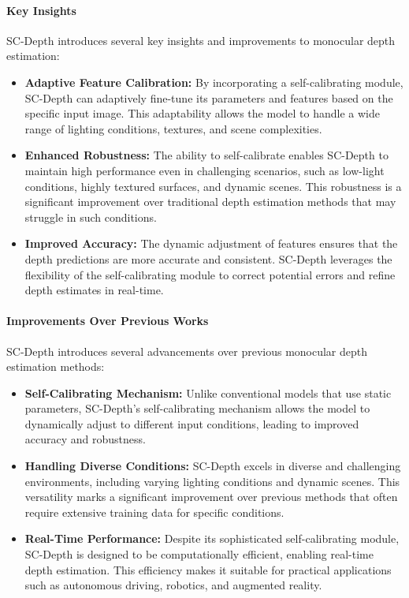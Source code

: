 \documentclass[12pt]{article}
\begin{document}
\paragraph{Key Insights}

SC-Depth introduces several key insights and improvements to monocular depth estimation:

\begin{itemize}
    \item \textbf{Adaptive Feature Calibration:} By incorporating a self-calibrating module, SC-Depth can adaptively fine-tune its parameters and features based on the specific input image. This adaptability allows the model to handle a wide range of lighting conditions, textures, and scene complexities.
    
    \item \textbf{Enhanced Robustness:} The ability to self-calibrate enables SC-Depth to maintain high performance even in challenging scenarios, such as low-light conditions, highly textured surfaces, and dynamic scenes. This robustness is a significant improvement over traditional depth estimation methods that may struggle in such conditions.
    
    \item \textbf{Improved Accuracy:} The dynamic adjustment of features ensures that the depth predictions are more accurate and consistent. SC-Depth leverages the flexibility of the self-calibrating module to correct potential errors and refine depth estimates in real-time.
\end{itemize}

\paragraph{Improvements Over Previous Works}

SC-Depth introduces several advancements over previous monocular depth estimation methods:

\begin{itemize}
    \item \textbf{Self-Calibrating Mechanism:} Unlike conventional models that use static parameters, SC-Depth's self-calibrating mechanism allows the model to dynamically adjust to different input conditions, leading to improved accuracy and robustness.
    
    \item \textbf{Handling Diverse Conditions:} SC-Depth excels in diverse and challenging environments, including varying lighting conditions and dynamic scenes. This versatility marks a significant improvement over previous methods that often require extensive training data for specific conditions.
    
    \item \textbf{Real-Time Performance:} Despite its sophisticated self-calibrating module, SC-Depth is designed to be computationally efficient, enabling real-time depth estimation. This efficiency makes it suitable for practical applications such as autonomous driving, robotics, and augmented reality.
\end{itemize}
\end{document}
